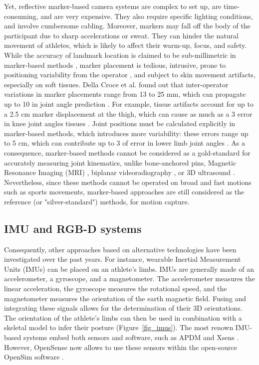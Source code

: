 Yet, reflective marker-based camera systems are complex to set up, are time-consuming, and are very expensive. They also require specific lighting conditions, and involve cumbersome cabling. Moreover, markers may fall off the body of the participant due to sharp accelerations or sweat. They can hinder the natural movement of athletes, which is likely to affect their warm-up, focus, and safety. While the accuracy of landmark location is claimed to be sub-millimetric in marker-based methods \cite{Topley2020}, marker placement is tedious, intrusive, prone to positioning variability from the operator \cite{Tsushima2003}, and subject to skin movement artifacts, especially on soft tissues. Della Croce et al. found out that inter-operator variations in marker placements range from 13 to 25 mm, which can propagate up to 10\degree{} in joint angle prediction \cite{Gorton2009,Croce1999}. For example, tissue artifacts account for up to a 2.5 cm marker displacement at the thigh, which can cause as much as a 3\degree{} error in knee joint angles tissues \cite{Benoit2015,Cappozzo1995}. Joint positions must be calculated explicitly in marker-based methods, which introduces more variability: these errors range up to 5 cm, which can contribute up to 3\degree{} of error in lower limb joint angles \cite{Leboeuf2019a}. As a consequence, marker-based methods cannot be considered as a gold-standard for accurately measuring joint kinematics, unlike bone-anchored pins, Magnetic Resonance Imaging (MRI) \cite{Yahia2004}, biplanar videoradiography \cite{Miranda2013, Kessler2019}, or 3D ultrasound \cite{Peters2010}. Nevertheless, since these methods cannot be operated on broad and fast motions such as sports movements, marker-based approaches are still considered as the reference (or "silver-standard") methods, for motion capture.


\FloatBarrier
\subsection{IMU and RGB-D systems}

Consequently, other approaches based on alternative technologies have been investigated over the past years. For instance, wearable Inertial Measurement Units (IMUs) can be placed on an athlete's limbs. IMUs are generally made of an accelerometer, a gyroscope, and a magnetometer. The accelerometer measures the linear acceleration, the gyroscope measures the rotational speed, and the magnetometer measures the orientation of the earth magnetic field. Fusing and integrating these signals allows for the determination of their 3D orientations. The orientation of the athlete's limbs can then be used in combination with a skeletal model to infer their posture (Figure~\ref{fig_imus}). The most renown IMU-based systems embed both sensors and software, such as APDM \cite{APDM} and Xsens \cite{Xsens}. However, OpenSense now allows to use these sensors within the open-source OpenSim software \cite{Borno2022}.

